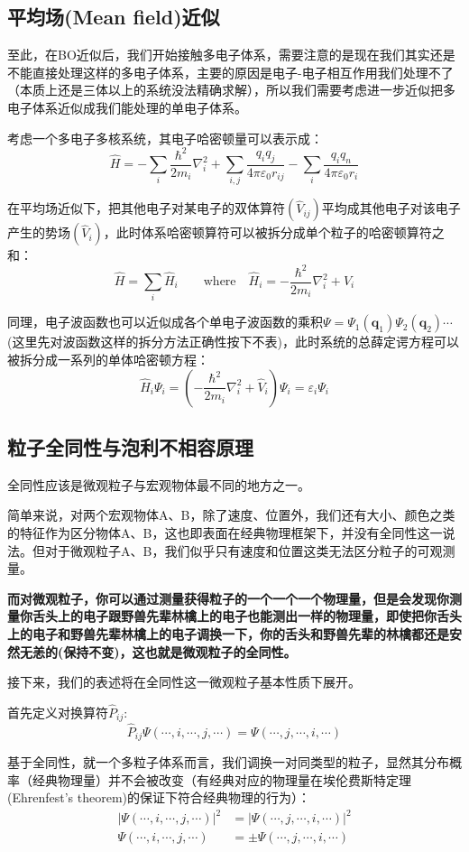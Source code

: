 \subsection{平均场(Mean field)近似}
至此，在BO近似后，我们开始接触多电子体系，需要注意的是现在我们其实还是不能直接处理这样的多电子体系，主要的原因是电子-电子相互作用我们处理不了（本质上还是三体以上的系统没法精确求解），所以我们需要考虑进一步近似把多电子体系近似成我们能处理的单电子体系。

考虑一个多电子多核系统，其电子哈密顿量可以表示成：
\[\hat{H}=-\sum_{i}\frac{\hbar^2}{2m_i}\nabla^2_i+\sum_{i,j}\frac{q_iq_j}{4 \pi \varepsilon_0 r_{ij}}-\sum_i\frac{q_iq_n}{4 \pi \varepsilon_0 r_{i}}\]

在平均场近似下，把其他电子对某电子的双体算符$(\hat{V}_{ij})$平均成其他电子对该电子产生的势场$(\hat{V}_{i})$，此时体系哈密顿算符可以被拆分成单个粒子的哈密顿算符之和：
\[\hat{H}=\sum_{i}\hat{H}_{i} \qquad \text{where} \quad \hat{H}_i=-\frac{\hbar^2}{2m_i}\nabla^2_i+V_i\]

同理，电子波函数也可以近似成各个单电子波函数的乘积$\varPsi=\varPsi_1(\bm{q}_1)\varPsi_2(\bm{q}_2)\cdots$(这里先对波函数这样的拆分方法正确性按下不表)，此时系统的总薛定谔方程可以被拆分成一系列的单体哈密顿方程：
\[\hat{H}_i\varPsi_i=\left( -\frac{\hbar^2}{2m_i}\nabla^2_i+\hat{V}_i \right)\varPsi_i=\varepsilon_i\varPsi_i\]

\subsection{粒子全同性与泡利不相容原理}
全同性应该是微观粒子与宏观物体最不同的地方之一。

简单来说，对两个宏观物体A、B，除了速度、位置外，我们还有大小、颜色之类的特征作为区分物体A、B，这也即表面在经典物理框架下，并没有全同性这一说法。但对于微观粒子A、B，我们似乎只有速度和位置这类无法区分粒子的可观测量。

\textbf{而对微观粒子，你可以通过测量获得粒子的一个一个一个物理量，但是会发现你测量你舌头上的电子跟野兽先辈林檎上的电子也能测出一样的物理量，即使把你舌头上的电子和野兽先辈林檎上的电子调换一下，你的舌头和野兽先辈的林檎都还是安然无恙的(保持不变)，这也就是微观粒子的全同性。}

接下来，我们的表述将在全同性这一微观粒子基本性质下展开。

首先定义对换算符$\hat{P}_{ij}$:
\[\hat{P}_{ij}\varPsi(\cdots,i,\cdots,j,\cdots)=\varPsi(\cdots,j,\cdots,i,\cdots)\]

基于全同性，就一个多粒子体系而言，我们调换一对同类型的粒子，显然其分布概率（经典物理量）并不会被改变（有经典对应的物理量在埃伦费斯特定理(Ehrenfest's theorem)的保证下符合经典物理的行为）：
\[\begin{aligned}
|\varPsi(\cdots,i,\cdots,j,\cdots)|^2&=|\varPsi(\cdots,j,\cdots,i,\cdots)|^2 \\ 
\varPsi(\cdots,i,\cdots,j,\cdots)&=\pm\varPsi(\cdots,j,\cdots,i,\cdots)
\end{aligned}\]

